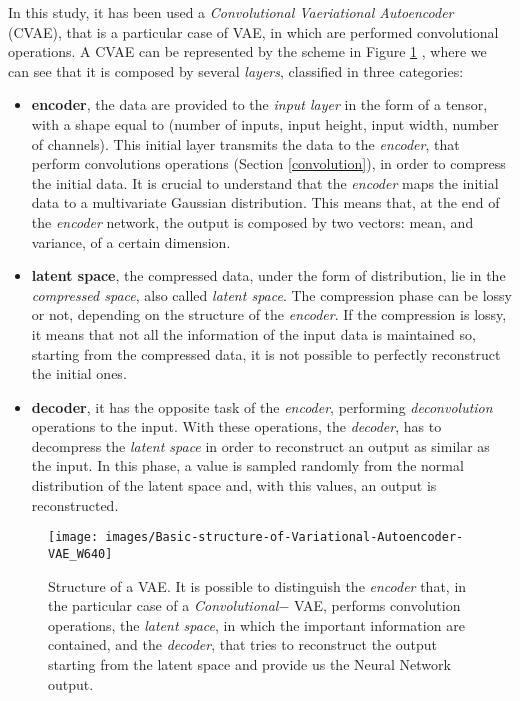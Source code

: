 \documentclass[12pt,a4paper,twocolumn]{article}
\begin{document}
		In this study, it has been used a \emph{Convolutional Vaeriational Autoencoder} (CVAE), that is a particular case of VAE, in which are performed convolutional operations.  A CVAE can be represented by the scheme in Figure \ref{fig:vaebasic} \cite{vae_scheme}, where we can see that it is composed by several \emph{layers}, classified in three categories:
		\begin{itemize}
			\item \textbf{encoder}, the data are provided to the \emph{input layer} in the form of a tensor, with a shape equal to (number of inputs, input height, input width, number of channels). This initial layer transmits the data to the \emph{encoder}, that perform convolutions operations (Section \ref{convolution}), in order to compress the initial data. It is crucial to understand that the \emph{encoder} maps the initial data to a multivariate Gaussian distribution. This means that, at the end of the \emph{encoder} network, the output is composed by two vectors: mean, and variance, of a certain dimension.
			\item \textbf{latent space}, the compressed data, under the form of distribution, lie in the \emph{compressed space}, also called \emph{latent space}. The compression phase can be lossy or not, depending on the structure of the \emph{encoder}. If the compression is lossy, it means that not all the information of the input data is maintained so, starting from the compressed data, it is not possible to perfectly reconstruct the initial ones.
			\item \textbf{decoder}, it has the opposite task of the \emph{encoder}, performing \emph{deconvolution} operations to the input. With these operations, the \emph{decoder}, has to decompress the \emph{latent space} in order to reconstruct an output as similar as the input. In this phase, a value is sampled randomly from the normal distribution of the latent space and, with this values, an output is reconstructed.
		\end{itemize}
	
		\begin{figure}[h!] 
			\centering
			\texttt{[image: images/Basic-structure-of-Variational-Autoencoder-VAE\_W640]}
			\caption{Structure of a VAE. It is possible to distinguish the \emph{encoder} that, in the particular case of a \emph{Convolutional}$-$ VAE, performs convolution operations, the \emph{ latent space}, in which the important information are contained, and the \emph{decoder}, that tries to reconstruct the output starting from the latent space and provide us the Neural Network output.}
			\label{fig:vaebasic}
		\end{figure}
	
\end{document}
